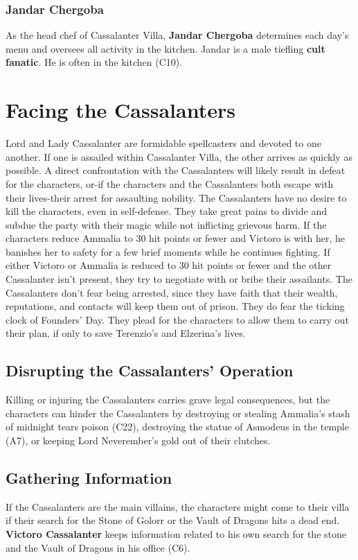 \documentclass[10pt,a4paper,twoside,twocolumn,openany,nodeprecatedcode]{dndbook}
\begin{document}
\subsubsection{Jandar Chergoba}
As the head chef of Cassalanter Villa, \textbf{Jandar Chergoba} determines each day's menu and oversees all activity in the kitchen.
Jandar is a male tiefling \textbf{cult fanatic}. He is often in the kitchen (C10).
\section{Facing the Cassalanters}
Lord and Lady Cassalanter are formidable spellcasters and devoted to one another. If one is assailed within Cassalanter Villa, the other arrives as quickly as possible.
A direct confrontation with the Cassalanters will likely result in defeat for the characters, or-if the characters and the Cassalanters both escape with their lives-their arrest for assaulting nobility. The Cassalanters have no desire to kill the characters, even in self-defense. They take great pains to divide and subdue the party with their magic while not inflicting grievous harm.
If the characters reduce Ammalia to 30 hit points or fewer and Victoro is with her, he banishes her to safety for a few brief moments while he continues fighting. If either Victoro or Ammalia is reduced to 30 hit points or fewer and the other Cassalanter isn't present, they try to negotiate with or bribe their assailants.
The Cassalanters don't fear being arrested, since they have faith that their wealth, reputations, and contacts will keep them out of prison. They do fear the ticking clock of Founders' Day. They plead for the characters to allow them to carry out their plan, if only to save Terenzio's and Elzerina's lives.
\subsection{Disrupting the Cassalanters' Operation}
Killing or injuring the Cassalanters carries grave legal consequences, but the characters can hinder the Cassalanters by destroying or stealing Ammalia's stash of midnight tears poison (C22), destroying the statue of Asmodeus in the temple (A7), or keeping Lord Neverember's gold out of their clutches.
\subsection{Gathering Information}
If the Cassalanters are the main villains, the characters might come to their villa if their search for the Stone of Golorr or the Vault of Dragons hits a dead end. \textbf{Victoro Cassalanter} keeps information related to his own search for the stone and the Vault of Dragons in his office (C6).
\end{document}
